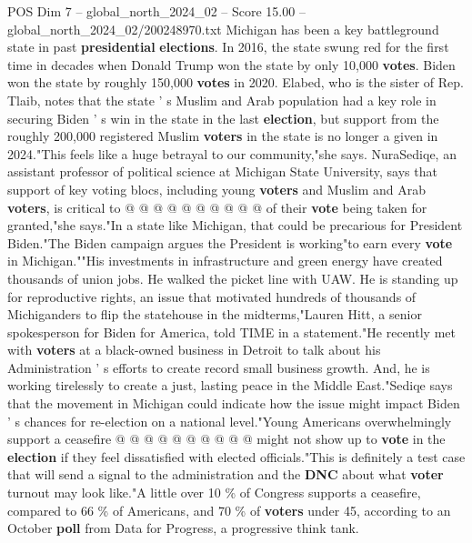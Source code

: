 \begin{textsample}{POS Dim 7 – global\_north\_2024\_02 – Score 15.00 – global\_north\_2024\_02/200248970.txt}
Michigan has been a key battleground state in past \textbf{presidential} \textbf{elections}.
In 2016, the state swung red for the first time in decades when Donald Trump won the state by only 10,000 \textbf{votes}.
Biden won the state by roughly 150,000 \textbf{votes} in 2020.
Elabed, who is the sister of Rep.
Tlaib, notes that the state ' s Muslim and Arab population had a key role in securing Biden ' s win in the state in the last \textbf{election}, but support from the roughly 200,000 registered Muslim \textbf{voters} in the state is no longer a given in 2024."This feels like a huge betrayal to our community,"she says.
NuraSediqe, an assistant professor of political science at Michigan State University, says that support of key voting blocs, including young \textbf{voters} and Muslim and Arab \textbf{voters}, is critical to @ @ @ @ @ @ @ @ @ @ of their \textbf{vote} being taken for granted,"she says."In a state like Michigan, that could be precarious for President Biden."The Biden campaign argues the President is working"to earn every \textbf{vote} in Michigan.""His investments in infrastructure and green energy have created thousands of union jobs.
He walked the picket line with UAW.
He is standing up for reproductive rights, an issue that motivated hundreds of thousands of Michiganders to flip the statehouse in the midterms,"Lauren Hitt, a senior spokesperson for Biden for America, told TIME in a statement."He recently met with \textbf{voters} at a black-owned business in Detroit to talk about his Administration ' s efforts to create record small business growth.
And, he is working tirelessly to create a just, lasting peace in the Middle East."Sediqe says that the movement in Michigan could indicate how the issue might impact Biden ' s chances for re-election on a national level."Young Americans overwhelmingly support a ceasefire @ @ @ @ @ @ @ @ @ @ might not show up to \textbf{vote} in the \textbf{election} if they feel dissatisfied with elected officials."This is definitely a test case that will send a signal to the administration and the \textbf{DNC} about what \textbf{voter} turnout may look like."A little over 10 \% of Congress supports a ceasefire, compared to 66 \% of Americans, and 70 \% of \textbf{voters} under 45, according to an October \textbf{poll} from Data for Progress, a progressive think tank.

\end{textsample}
